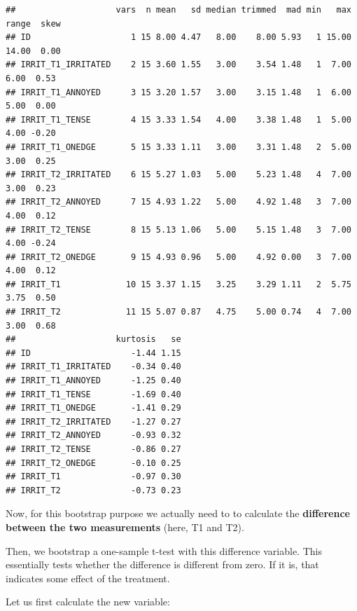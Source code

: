 \documentclass[
]{book}
\begin{document}
\begin{verbatim}
##                    vars  n mean   sd median trimmed  mad min   max range  skew
## ID                    1 15 8.00 4.47   8.00    8.00 5.93   1 15.00 14.00  0.00
## IRRIT_T1_IRRITATED    2 15 3.60 1.55   3.00    3.54 1.48   1  7.00  6.00  0.53
## IRRIT_T1_ANNOYED      3 15 3.20 1.57   3.00    3.15 1.48   1  6.00  5.00  0.00
## IRRIT_T1_TENSE        4 15 3.33 1.54   4.00    3.38 1.48   1  5.00  4.00 -0.20
## IRRIT_T1_ONEDGE       5 15 3.33 1.11   3.00    3.31 1.48   2  5.00  3.00  0.25
## IRRIT_T2_IRRITATED    6 15 5.27 1.03   5.00    5.23 1.48   4  7.00  3.00  0.23
## IRRIT_T2_ANNOYED      7 15 4.93 1.22   5.00    4.92 1.48   3  7.00  4.00  0.12
## IRRIT_T2_TENSE        8 15 5.13 1.06   5.00    5.15 1.48   3  7.00  4.00 -0.24
## IRRIT_T2_ONEDGE       9 15 4.93 0.96   5.00    4.92 0.00   3  7.00  4.00  0.12
## IRRIT_T1             10 15 3.37 1.15   3.25    3.29 1.11   2  5.75  3.75  0.50
## IRRIT_T2             11 15 5.07 0.87   4.75    5.00 0.74   4  7.00  3.00  0.68
##                    kurtosis   se
## ID                    -1.44 1.15
## IRRIT_T1_IRRITATED    -0.34 0.40
## IRRIT_T1_ANNOYED      -1.25 0.40
## IRRIT_T1_TENSE        -1.69 0.40
## IRRIT_T1_ONEDGE       -1.41 0.29
## IRRIT_T2_IRRITATED    -1.27 0.27
## IRRIT_T2_ANNOYED      -0.93 0.32
## IRRIT_T2_TENSE        -0.86 0.27
## IRRIT_T2_ONEDGE       -0.10 0.25
## IRRIT_T1              -0.97 0.30
## IRRIT_T2              -0.73 0.23
\end{verbatim}

Now, for this bootstrap purpose we actually need to to calculate the \textbf{difference between the two measurements} (here, T1 and T2).

Then, we bootstrap a one-sample t-test with this difference variable. This essentially tests whether the difference is different from zero. If it is, that indicates some effect of the treatment.

Let us first calculate the new variable:
\end{document}
